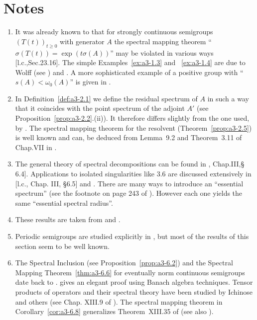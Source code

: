 \section*{Notes}\label{notes:a3-notes}
\begin{enumerate}[label=\emph{Section \arabic*:}, wide, itemsep=1ex]
\item 
It was already known to \citet{hillephillips:1957} that for strongly continuous semigroups $(T(t))_{t\geq 0}$ with generator $A$ the spectral mapping theorem \enquote{$\sigma(T(t)) = \exp(t\sigma(A))$} may be violated in various ways [l.c.,Sec.23.16].
The simple Examples~\ref{ex:a3-1.3} and ~\ref{ex:a3-1.4} are due to Wolff (see \citet{greinervoigtwolff:1981}) and \citet{zabczyk:1975}.
A more sophisticated example of a positive group with 
\enquote{$s(A) < \omega_{0}(A)$} is given in \citet{wolff:1981}.

\item 
In Definition~\ref{def:a3-2.1} we define the residual spectrum of $A$ in such a way that it coincides with the point spectrum of the adjoint $A'$ (see Proposition~\ref{prop:a3-2.2}.(ii)).
It therefore differs slightly from the one used, \eg by \citet{schaefer:1974}.
The spectral mapping theorem for the resolvent (Theorem~\ref{prop:a3-2.5}) is well known and can, \eg be deduced from Lemma~9.2 and Theorem~3.11 of Chap.VII in \citet{dunfordschwartz:1958}.

\item 
The general theory of spectral decompositions can be found in \citet{kato:1966}, Chap.III,§ 6.4].
Applications to isolated singularities like 3.6 are discussed extensively in [l.c., Chap. III, §6.5] and \citet[Chap.VIII, Sec.8]{yosida:1965}.
There are many ways to introduce an \enquote{essential spectrum} (see the footnote on page 243 of \citet{kato:1966}).
However each one yields the same \enquote{essential spectral radius}.

\item 
These results are taken from \citet{derndinger:1980} and \citet{greiner:1981}.

\item 
Periodic semigroups are studied explicitly in \citet{bart:1977}, but most of the results of this section seem to be well known.

\item
The Spectral Inclusion (see Proposition~\ref{prop:a3-6.2}) and the Spectral Mapping Theorem~\ref{thm:a3-6.6} for eventually norm continuous semigroups date back to \citet{hillephillips:1957}.
\citet{davies:1980} gives an elegant proof using Banach algebra techniques.
Tensor products of operators and their spectral theory have been studied by Ichinose and others (see Chap. XIII.9 of \citet{reedsimon:1978}).
The spectral mapping theorem in Corollary~\ref{cor:a3-6.8} generalizes Theorem~XIII.35 of \citet{reedsimon:1978} (see also \citet{herbst:1982}).


\end{enumerate}
